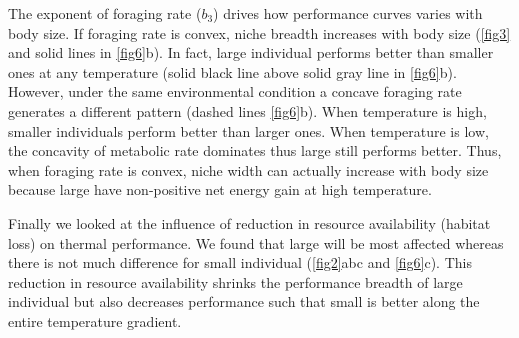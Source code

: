 The exponent of foraging rate ($b_3$) drives how performance curves varies with body size.
If foraging rate is convex, niche breadth increases with body size (\cref{fig3} and solid lines in \cref{fig6}b).
In fact, large individual performs better than smaller ones at any temperature (solid black line above solid gray line in \cref{fig6}b).
However, under the same environmental condition a concave foraging rate generates a different pattern (dashed lines \cref{fig6}b).
When temperature is high, smaller individuals perform better than larger ones.
When temperature  is low, the concavity of metabolic rate dominates thus large still performs better.
Thus, when foraging rate is convex, niche width can actually increase with body size because large have non-positive net energy  gain at high temperature. 
   
Finally we looked at the influence of reduction in resource availability (habitat loss) on thermal performance.
We found that large will be most affected whereas there is not much difference for small individual (\cref{fig2}abc and \cref{fig6}c).
 This reduction in resource availability shrinks the performance breadth of large individual but also decreases performance such that small is better along the entire temperature gradient.

